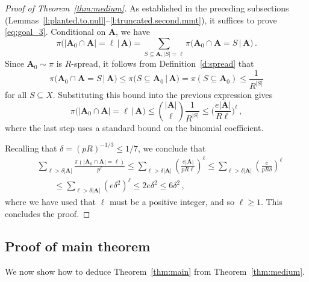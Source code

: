 \documentclass[11pt,reqno]{amsart}
\theoremstyle{plain}
\theoremstyle{definition}
\theoremstyle{remark}
\newcommand{\bA}{\mathbf{A}}
\begin{document}
\begin{proof}[Proof of Theorem~\ref{thm:medium}]
As established in the preceding subsections (Lemmas~\ref{l:planted.to.null}--\ref{l:truncated.second.mmt}), it suffices to prove \eqref{eq:goal_3}. Conditional on $\bA$, we have
	\[
	\pi\Big(
		|\bA_0 \cap \bA|=\ell \,\Big|\, \bA  \Big)
	= \sum_{S \subseteq \bA, |S|=\ell} \pi (\bA_0 \cap \bA=S 
		\,\Big|\, \bA  \Big)
	\,.\]
Since $\bA_0\sim\pi$ is $R$-spread, it follows from Definition~\ref{d:spread} that 
	\[
	\pi\Big(
		\bA_0 \cap \bA = S \,\Big|\, \bA  \Big)
	\le \pi\Big(S\subseteq \bA_0 \,\Big|\, \bA  \Big)
	= \pi(S\subseteq \bA_0)
	\le \frac{1}{R^{|S|}}
	\]
for all $S\subseteq X$. Substituting this bound into the previous expression gives
	\[\pi\Big(
		|\bA_0 \cap \bA|=\ell \,\Big|\, \bA  \Big)
	\le \binom{|\bA|}{\ell} \frac{1}{R^{|S|}}
	\le \bigg(\frac{e |\bA| }{R\ell} \bigg)^\ell\,,
	\]
where the last step uses a standard bound on the binomial coefficient. 



Recalling that $\delta=(pR)^{-1/3} \le 1/7$, we conclude that 
\begin{align*}
	&\sum_{\ell > \delta |\bA|} 
	\frac{\pi(|\bA_0 \cap \bA|=\ell  )}{p^\ell}
	\leq \sum_{\ell > \delta |\bA|} 
		\left(\frac{e |\bA| }{pR\ell }  \right)^{\ell} 
	\le \sum_{\ell > \delta |\bA|} 
		\left(\frac{e  }{pR\delta}  \right)^{\ell} 
	\\
&\qquad  
\leq \sum_{\ell >\delta|\bA|} \left(e \delta^{2} \right)^{\ell} 
\le 2e \delta^{2} \leq 6\delta^{2}\,,
\end{align*}
where we have used that $\ell$ must be a positive integer, and so $\ell\ge1$. This concludes the proof.
\end{proof}



\subsection{Proof of main theorem}
\label{sec:implic} 

We now show how to deduce
Theorem~\ref{thm:main} from Theorem~\ref{thm:medium}. 

\end{document}
